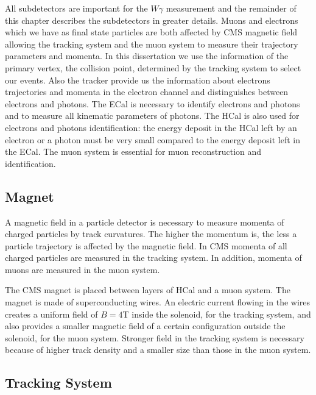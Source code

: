 All subdetectors are important for the $W\gamma$ measurement and the remainder of this chapter describes the subdetectors in greater details. Muons and electrons which we have as final state particles are both affected by CMS magnetic field allowing the tracking system and the muon system to measure their trajectory parameters and momenta. In this dissertation we use the information of the primary vertex, the collision point, determined by the tracking system to select our events. Also the tracker provide us the information about electrons trajectories and momenta in the electron channel and distinguishes between electrons and photons. The ECal is necessary to identify electrons and photons and to measure all kinematic parameters of photons. The HCal is also used for electrons and photons identification: the energy deposit in the HCal left by an electron or a photon must be very small compared to the energy deposit left in the ECal. The muon system is essential for muon reconstruction and identification.

\subsection{Magnet}

A magnetic field in a particle detector is necessary to measure momenta of charged particles by track curvatures. The higher the momentum is, the less a particle trajectory is affected by the magnetic field. In CMS momenta of all charged particles are measured in the tracking system. In addition, momenta of muons are measured in the muon system. 

The CMS magnet is placed between layers of HCal and a muon system. The magnet is made of superconducting wires. An electric current flowing in the wires creates a uniform field of $B=4$T inside the solenoid, for the tracking system, and also provides a smaller magnetic field of a certain configuration outside the solenoid, for the muon system. Stronger field in the tracking system is necessary because of higher track density and a smaller size than those in the muon system.

\subsection{Tracking System}

